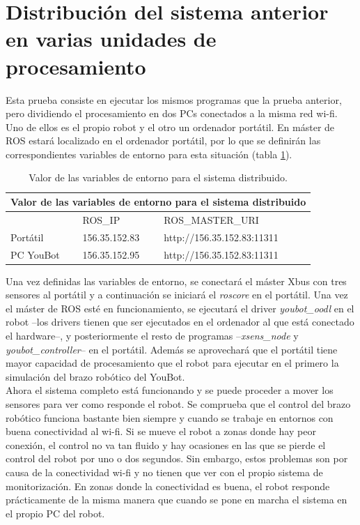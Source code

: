 \documentclass[12pt, a4paper]{report}
\begin{document}
\section{Distribución del sistema anterior en varias unidades de procesamiento}

Esta prueba consiste en ejecutar los mismos programas que la prueba anterior, pero dividiendo el procesamiento en dos PCs conectados a la misma red wi-fi. Uno de ellos es el propio robot y el otro un ordenador portátil. En máster de ROS estará localizado en el ordenador portátil, por lo que se definirán las correspondientes variables de entorno para esta situación (tabla \ref{tab:var_entorno}).

\begin{table}[h]
	\center
	\begin{tabular}{|l|l|l|}
	\hline
	\multicolumn{3}{|c|}{\textbf{Valor de las variables de entorno para el sistema distribuido}}\\
	\hline
	& ROS\_IP & ROS\_MASTER\_URI \\
	\hline
	Portátil & 156.35.152.83 & http://156.35.152.83:11311 \\
	PC YouBot & 156.35.152.95 & http://156.35.152.83:11311 \\
	\hline
	\end{tabular}

	\caption[Valor de las variables de entorno para el sistema distribuido]{Valor de las variables de entorno para el sistema distribuido.}
	\label{tab:var_entorno}

\end{table}

Una vez definidas las variables de entorno, se conectará el máster Xbus con tres sensores al portátil y a continuación se iniciará el \textit{roscore} en el portátil. Una vez el máster de ROS esté en funcionamiento, se ejecutará el driver \textit{youbot\_oodl} en el robot --los drivers tienen que ser ejecutados en el ordenador al que está conectado el hardware--, y posteriormente el resto de programas --\textit{xsens\_node} y \textit{youbot\_controller}-- en el portátil. Además se aprovechará que el portátil tiene mayor capacidad de procesamiento que el robot para ejecutar en el primero la simulación del brazo robótico del YouBot.\\

Ahora el sistema completo está funcionando y se puede proceder a mover los sensores para ver como responde el robot. Se comprueba que el control del brazo robótico funciona bastante bien siempre y cuando se trabaje en entornos con buena conectividad al wi-fi. Si se mueve el robot a zonas donde hay peor conexión, el control no va tan fluido y hay ocasiones en las que se pierde el control del robot por uno o dos segundos. Sin embargo, estos problemas son por causa de la conectividad wi-fi y no tienen que ver con el propio sistema de monitorización. En zonas donde la conectividad es buena, el robot responde prácticamente de la misma manera que cuando se pone en marcha el sistema en el propio PC del robot.
\end{document}

